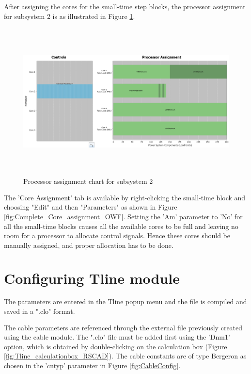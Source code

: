 After assigning the cores for the small-time step blocks, the processor assignment for subsystem 2 is as illustrated in Figure \ref{fig:subsystem2_processor}.

\begin{figure}[H]
\centering
    \includegraphics[height = 8cm,width = 17cm]{Diagrams/Chapter_4/subsystem2_processor.PNG}
    \caption{Processor assignment chart for subsystem 2}
    \label{fig:subsystem2_processor}
\end{figure}

The 'Core Assignment' tab is available by right-clicking the small-time block and choosing "Edit" and then "Parameters" as shown in Figure \ref{fig:Complete_Core_assignment_OWF}. Setting the 'Am' parameter to 'No' for all the small-time blocks causes all the available cores to be full and leaving no room for a processor to allocate control signals. Hence these cores should be manually assigned, and proper allocation has to be done.


\section{Configuring Tline module}\label{config_Tline}
The parameters are entered in the Tline popup menu and the file is compiled and saved in a ".clo" format.

The cable parameters are referenced through the external file previously created using the cable module. %
The ".clo" file must be added first using the 'Dnm1' option, which is obtained by double-clicking on the calculation box (Figure \ref{fig:Tline_calculationbox_RSCAD}). The cable constants are of type Bergeron as chosen in the 'cntyp' parameter in Figure \ref{fig:CableConfig}.

